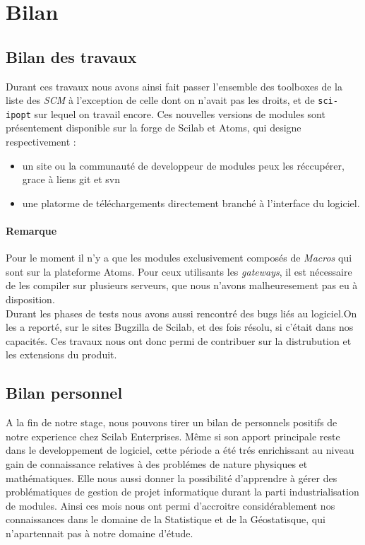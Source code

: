 \section*{Bilan}

\subsection*{Bilan des travaux}
Durant ces travaux nous avons ainsi fait passer l’ensemble des toolboxes
de la liste des {\it SCM} \`a l’exception de celle dont on n'avait pas les droits,
et de {\tt sci-ipopt} sur lequel on travail encore. 
Ces nouvelles versions de modules sont présentement disponible
sur la forge de Scilab et Atoms, qui designe respectivement :

\begin{itemize}
\item un site ou la communauté de developpeur de modules peux les réccupérer,
grace à liens git et svn
\item une platorme de téléchargements directement branché à l'interface du logiciel.
\end{itemize}

\paragraph{Remarque}
Pour le moment il n'y a que les modules exclusivement composés
de {\it Macros} qui sont sur la plateforme Atoms.
Pour ceux utilisants les {\it gateways}, il est nécessaire de les
compiler sur plusieurs serveurs, que nous n'avons malheuresement
pas eu à disposition.
\\
Durant les phases de tests nous avons aussi rencontré des bugs liés au logiciel.On les
a reporté, sur le sites Bugzilla de Scilab, et des fois résolu, si c'était dans nos capacités.
Ces travaux nous ont donc permi de contribuer sur la distrubution et les extensions du produit.

\subsection*{Bilan personnel}
A la fin de notre stage, nous pouvons tirer un bilan de personnels positifs de notre experience chez
Scilab Enterprises. Même si son apport principale reste dans le developpement de logiciel, cette période
a été trés enrichissant au niveau gain de connaissance relatives à des problémes de nature physiques et mathématiques.
Elle nous aussi donner la possibilité d'apprendre à gérer des problématiques de gestion de projet informatique durant la
parti industrialisation de modules.
Ainsi ces mois nous ont permi d'accroitre considérablement nos connaissances dans le domaine de la Statistique
et de la Géostatisque, qui n'apartennait pas à notre domaine d'étude.

